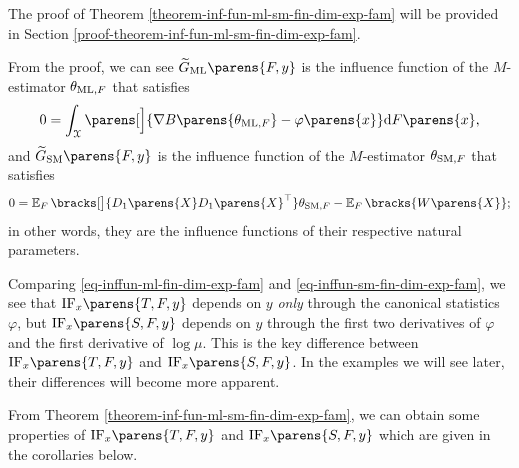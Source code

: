 The proof of Theorem \ref{theorem-inf-fun-ml-sm-fin-dim-exp-fam} will be provided in Section \ref{proof-theorem-inf-fun-ml-sm-fin-dim-exp-fam}. 

From the proof, we can see $\widetilde{G}_{\ML} \parens{F, y}$ is the influence function of the $M$-estimator $\theta_{\mathrm{ML}, F}$ that satisfies 
\begin{align*}
	0 = \int_{\calX} \parens[\Big]{\nabla B \parens{\theta_{\ML, F}} - \varphi \parens{x}} \diff F \parens{x}, 
\end{align*}
and $\widetilde{G}_{\SM} \parens{F, y}$ is the influence function of the $M$-estimator $\theta_{\mathrm{SM}, F}$ that satisfies 
\begin{align*}
	0 = \E_F \bracks[\big]{D_1 \parens{X} D_1 \parens{X}^\top} \theta_{\SM, F} - \E_F \bracks{W \parens{X}}; 
\end{align*}
in other words, they are the influence functions of their respective natural parameters. %

Comparing \eqref{eq-inffun-ml-fin-dim-exp-fam} and \eqref{eq-inffun-sm-fin-dim-exp-fam}, we see that $\mathrm{IF}_x \parens{T, F, y}$ depends on $y$ \emph{only} through the canonical statistics $\varphi$, but $\mathrm{IF}_x \parens{S, F, y}$ depends on $y$ through the first two derivatives of $\varphi$ and the first derivative of $\log \mu$. This is the key difference between $\mathrm{IF}_x \parens{T, F, y}$ and $\mathrm{IF}_x \parens{S, F, y}$. In the examples we will see later, their differences will become more apparent. 

From Theorem \ref{theorem-inf-fun-ml-sm-fin-dim-exp-fam}, we can obtain some properties of $\mathrm{IF}_x \parens{T, F, y}$ and $\mathrm{IF}_x \parens{S, F, y}$ which are given in the corollaries below. 

